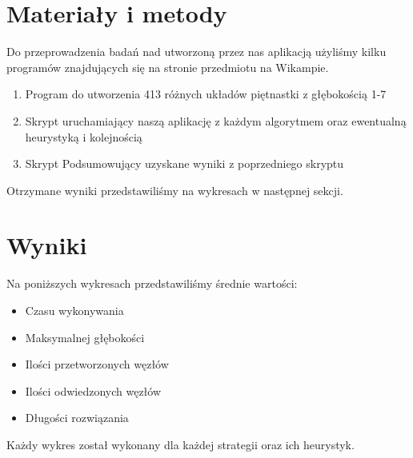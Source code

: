 \documentclass{classrep}
\begin{document}
\section{Materiały i metody} %
Do przeprowadzenia badań nad utworzoną przez nas aplikacją użyliśmy kilku programów znajdujących się na stronie przedmiotu na Wikampie.
\begin{enumerate}
\item Program do utworzenia 413 różnych układów piętnastki z głębokością 1-7
\item Skrypt uruchamiający naszą aplikację z każdym algorytmem oraz ewentualną heurystyką i kolejnością
\item Skrypt Podsumowujący uzyskane wyniki z poprzedniego skryptu
\end{enumerate}
Otrzymane wyniki przedstawiliśmy na wykresach w następnej sekcji.

\section{Wyniki} %
Na poniższych wykresach przedstawiliśmy średnie wartości:
\begin{itemize}
\item Czasu wykonywania
\item Maksymalnej głębokości
\item Ilości przetworzonych węzłów
\item Ilości odwiedzonych węzłów
\item Długości rozwiązania
\end{itemize}
Każdy wykres został wykonany dla każdej strategii oraz ich heurystyk.

\newpage
\end{document}
